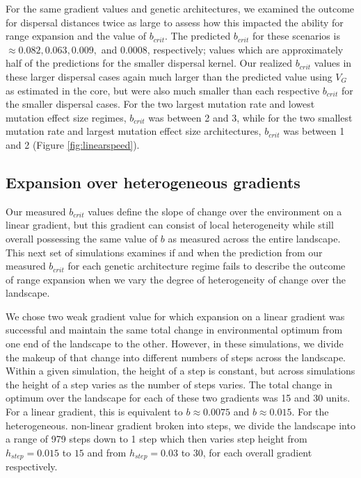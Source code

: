 For the same gradient values and genetic architectures, we examined the outcome for dispersal distances twice as large to assess how this impacted the ability for range expansion and the value of $b_{crit}$. The predicted $b_{crit}$ for these scenarios is $\approx 0.082, 0.063, 0.009,$ and $0.0008$, respectively; values which are approximately half of the predictions for the smaller dispersal kernel. Our realized $b_{crit}$ values in these larger dispersal cases again much larger than the predicted value using $V_G$ as estimated in the core, but were also much smaller than each respective $b_{crit}$ for the smaller dispersal cases. For the two largest mutation rate and lowest mutation effect size regimes, $b_{crit}$ was between 2 and 3, while for the two smallest mutation rate and largest mutation effect size architectures, $b_{crit}$ was between 1 and 2 (Figure \ref{fig:linearspeed}).











\subsection{Expansion over heterogeneous gradients}

Our measured $b_{crit}$ values define the slope of change over the environment on a linear gradient, but this gradient can consist of local heterogeneity while still overall possessing the same value of $b$ as measured across the entire landscape. This next set of simulations examines if and when the prediction from our measured $b_{crit}$ for each genetic architecture regime fails to describe the outcome of range expansion when we vary the degree of heterogeneity of change over the landscape. 

We chose two weak gradient value for which expansion on a linear gradient was successful and maintain the same total change in environmental optimum from one end of the landscape to the other. However, in these simulations, we divide the makeup of that change into different numbers of steps across the landscape. Within a given simulation, the height of a step is constant, but across simulations the height of a step varies as the number of steps varies. The total change in optimum over the landscape for each of these two gradients was 15 and 30 units. For a linear gradient, this is equivalent to $b \approx 0.0075$ and $b \approx 0.015$. For the heterogeneous. non-linear  gradient broken into steps, we divide the landscape into a range of 979 steps down to 1 step which then varies step height from $h_{step} = 0.015$ to $15$ and from $h_{step} = 0.03$ to $30$, for each overall gradient respectively. 

